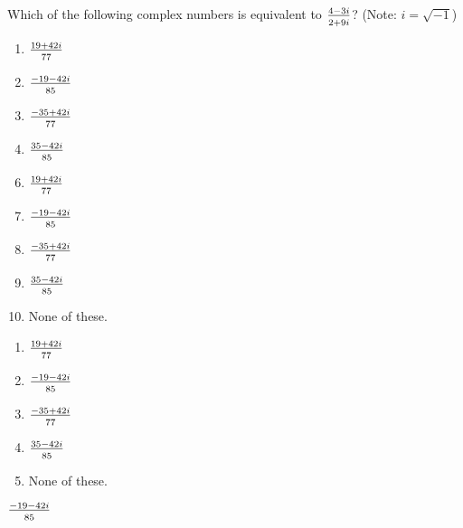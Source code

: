  
Which of the following complex numbers is equivalent to {\Large $\frac{4-3i}{\rule{0mm}{2.5mm}2+9i}$}? (Note: $i=\sqrt{-1}$)


\ifsat
	\begin{enumerate}[label=\Alph*)]
		\item {\Large$\frac{19+42i}{\rule{0mm}{2.5mm}77} $ }
		\item {\Large$\frac{-19-42i}{\rule{0mm}{2.5mm}85} $ } %
		\item {\Large$\frac{-35+42i}{\rule{0mm}{2.5mm}77} $ }
		\item {\Large$\frac{35-42i}{\rule{0mm}{2.5mm}85} $}
	\end{enumerate}
\else
\fi

\ifacteven
	\begin{enumerate}[label=\textbf{\Alph*.},itemsep=\fill,align=left]
		\setcounter{enumii}{5}
		\item {\Large$\frac{19+42i}{\rule{0mm}{2.5mm}77} $ }
		\item {\Large$\frac{-19-42i}{\rule{0mm}{2.5mm}85} $ } %
		\item {\Large$\frac{-35+42i}{\rule{0mm}{2.5mm}77} $ }
		\addtocounter{enumii}{1}
		\item {\Large$\frac{35-42i}{\rule{0mm}{2.5mm}85} $}
		\item None of these. 
	\end{enumerate}
\else
\fi

\ifactodd
	\begin{enumerate}[label=\textbf{\Alph*.},itemsep=\fill,align=left]
		\item {\Large$\frac{19+42i}{\rule{0mm}{2.5mm}77} $ }
		\item {\Large$\frac{-19-42i}{\rule{0mm}{2.5mm}85} $ } %
		\item {\Large$\frac{-35+42i}{\rule{0mm}{2.5mm}77} $ }
		\item {\Large$\frac{35-42i}{\rule{0mm}{2.5mm}85} $}
		\item None of these. 
	\end{enumerate}
\else
\fi

\ifgridin
 {\Large$\frac{-19-42i}{\rule{0mm}{2.5mm}85} $ } %
		
\else
\fi

